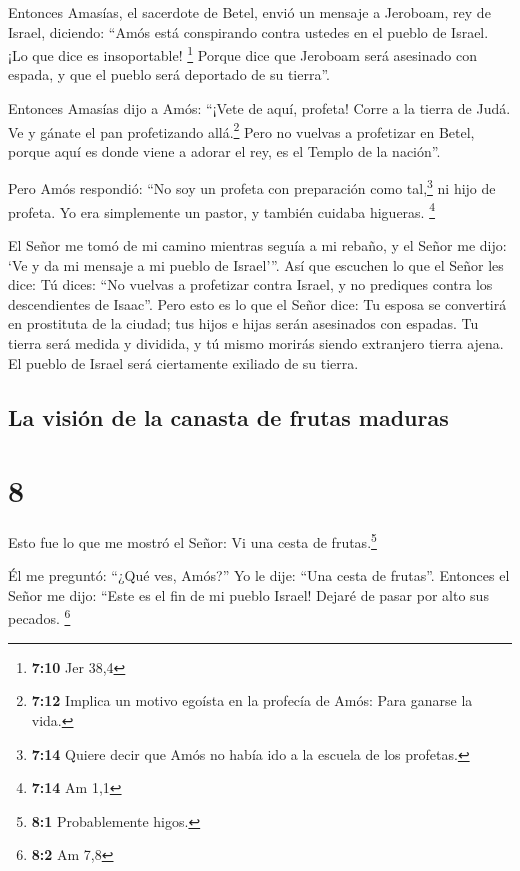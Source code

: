  Entonces Amasías, el sacerdote de Betel, envió un
mensaje a Jeroboam, rey de Israel, diciendo: ``Amós está conspirando
contra ustedes en el pueblo de Israel. ¡Lo que dice es insoportable!
\footnote{\textbf{7:10} Jer 38,4}  Porque dice que
Jeroboam será asesinado con espada, y que el pueblo será deportado de su
tierra''.

 Entonces Amasías dijo a Amós: ``¡Vete de aquí, profeta!
Corre a la tierra de Judá. Ve y gánate el pan profetizando
allá.\footnote{\textbf{7:12} Implica un motivo egoísta en la profecía de
  Amós: Para ganarse la vida.}  Pero no vuelvas a
profetizar en Betel, porque aquí es donde viene a adorar el rey, es el
Templo de la nación''.

 Pero Amós respondió: ``No soy un profeta con preparación
como tal,\footnote{\textbf{7:14} Quiere decir que Amós no había ido a la
  escuela de los profetas.} ni hijo de profeta. Yo era simplemente un
pastor, y también cuidaba higueras. \footnote{\textbf{7:14} Am 1,1}

 El Señor me tomó de mi camino mientras seguía a mi
rebaño, y el Señor me dijo: `Ve y da mi mensaje a mi pueblo de
Israel'''.  Así que escuchen lo que el Señor les dice: Tú
dices: ``No vuelvas a profetizar contra Israel, y no prediques contra
los descendientes de Isaac''.  Pero esto es lo que el
Señor dice: Tu esposa se convertirá en prostituta de la ciudad; tus
hijos e hijas serán asesinados con espadas. Tu tierra será medida y
dividida, y tú mismo morirás siendo extranjero tierra ajena. El pueblo
de Israel será ciertamente exiliado de su tierra.

\hypertarget{la-visiuxf3n-de-la-canasta-de-frutas-maduras}{%
\subsection{La visión de la canasta de frutas
maduras}\label{la-visiuxf3n-de-la-canasta-de-frutas-maduras}}

\hypertarget{section-7}{%
\section{8}\label{section-7}}

 Esto fue lo que me mostró el Señor: Vi una cesta de
frutas.\footnote{\textbf{8:1} Probablemente higos.}

 Él me preguntó: ``¿Qué ves, Amós?'' Yo le dije: ``Una
cesta de frutas''. Entonces el Señor me dijo: ``Este es el fin de mi
pueblo Israel! Dejaré de pasar por alto sus pecados. \footnote{\textbf{8:2}
  Am 7,8}

